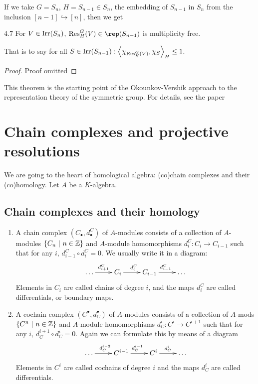 \documentclass[twoside = false,	%
		headsepline,		%
		parskip = true,
		]{scrbook}						%
\begin{document}
        If we take $G=S_n$, $H = S_{n-1} \in S_n$, the embedding of $S_{n-1}$ in $S_n$ from the inclusion $[n-1] \hookrightarrow [n]$, then we get
        \begin{theorem}{}{4.7}
            For $V \in \mathrm{Irr}(S_n)$, $\Res_H^G(V) \in \rep(S_{n-1})$ is multiplicity free.

            That is to say for all $S \in \mathrm{Irr}(S_{n-1}): \left\langle \chi_{\mathrm{Res}_H^G(V)},\chi_S\right\rangle_H \leq 1$.
        \end{theorem}

        \begin{proof}{Proof omitted}
        \end{proof}

        This theorem is the starting point of the Okounkov-Vershik approach to the representation theory of the symmetric group. For details, see the paper \cite{VershikOkounkov.2005}

\section{Chain complexes and projective resolutions}
    We are going to the heart of homological algebra: (co)chain complexes and their (co)homology. Let $A$ be a $K$-algebra.

    \subsection{Chain complexes and their homology}
        \begin{definition}{}{}
            \begin{enumerate}
                \item A chain complex $(C_\bullet, d^C_\bullet)$ of $A$-modules consists of a collection of $A$-modules $\{ C_n \ | \  n \in \mathbb Z \}$ and $A$-module homomorphisms $d_i^C: C_i \to C_{i-1}$ such that for any $i$, $d_{i-1}^C \circ d_i^C = 0$. We usually write it in a diagram:
                \begin{equation*}
                \xymatrix {
                    \dots \ar[r]^{d_{i+1}^C} & C_i \ar[r]^{d_{i}^C} & C_{i-1} \ar[r]^{d_{i-1}^C} & \dots
                }
                \end{equation*}
                Elements in $C_i$ are called chains of degree $i$, and the maps $d_i^C$ are called differentials, or boundary maps.
                \item A cochain complex $(C^\bullet,d^\bullet_C)$ of $A$-modules consists of a collection of $A$-mods $\{C^n \ | \ n \in \mathbb Z \}$ and $A$-module homomorphisms $d_C^i: C^i \to C^{i+1}$ such that for any $i$, $d_C^{i+1} \circ d_C^{i} = 0$. Again we can formulate this by means of a diagram
                \begin{equation*}
                \xymatrix {
                    \dots \ar[r]^{d^{i-2}_C} & C^{i-1} \ar[r]^{d^{i-1}_C} & C^i \ar[r]^{d^{i}_C} & \dots
                }
                \end{equation*}
                Elements in $C^i$ are called cochains of degree $i$ and the maps $d_C^i$ are called differentials.
            \end{enumerate}
        \end{definition}
\end{document}

